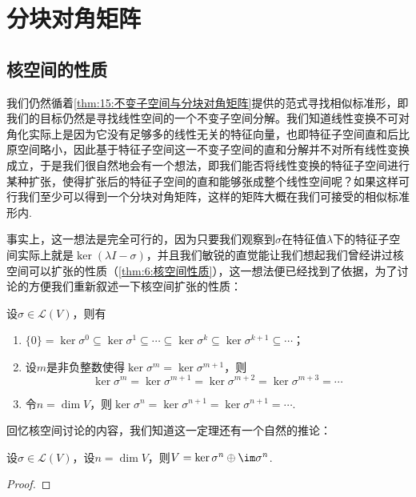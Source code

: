 \section{分块对角矩阵}

\subsection{核空间的性质}

我们仍然循着\autoref{thm:15:不变子空间与分块对角矩阵}提供的范式寻找相似标准形，即我们的目标仍然是寻找线性空间的一个不变子空间分解。我们知道线性变换不可对角化实际上是因为它没有足够多的线性无关的特征向量，也即特征子空间直和后比原空间略小，因此基于特征子空间这一不变子空间的直和分解并不对所有线性变换成立，于是我们很自然地会有一个想法，即我们能否将线性变换的特征子空间进行某种扩张，使得扩张后的特征子空间的直和能够张成整个线性空间呢？如果这样可行我们至少可以得到一个分块对角矩阵，这样的矩阵大概在我们可接受的相似标准形内.

事实上，这一想法是完全可行的，因为只要我们观察到$\sigma$在特征值$\lambda$下的特征子空间实际上就是$\ker(\lambda I-\sigma)$，并且我们敏锐的直觉能让我们想起我们曾经讲过核空间可以扩张的性质（\autoref{thm:6:核空间性质}），这一想法便已经找到了依据，为了讨论的方便我们重新叙述一下核空间扩张的性质：
\begin{theorem}\label{thm:16:核空间性质}
    设$\sigma\in \mathcal{L}(V)$，则有
    \begin{enumerate}
        \item $\{0\}=\ker \sigma^0\subseteq\ker \sigma^1\subseteq\cdots\subseteq\ker \sigma^k\subseteq\ker \sigma^{k+1}\subseteq\cdots$；

        \item 设$m$是非负整数使得$\ker \sigma^m=\ker \sigma^{m+1}$，则
              \[\ker \sigma^m=\ker \sigma^{m+1}=\ker \sigma^{m+2}=\ker \sigma^{m+3}=\cdots\]

        \item 令$n=\dim V$，则$\ker \sigma^n=\ker \sigma^{n+1}=\ker \sigma^{n+1}=\cdots$.
    \end{enumerate}
\end{theorem}

回忆核空间讨论的内容，我们知道这一定理还有一个自然的推论：
\begin{theorem} \label{thm:16:核空间扩张分解}
    设$\sigma\in\mathcal{L}(V)$，设$n=\dim V$，则$V=\ker \sigma^n\oplus \im \sigma^n$.
\end{theorem}
\begin{proof}

\end{proof}


